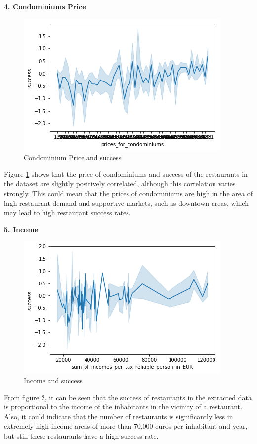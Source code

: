 \documentclass[a4paper, 11pt, oneside]{Thesis}  %
\begin{document}
\textbf{4.	Condominiums Price}
 
\begin{figure}[h]
\includegraphics[scale=0.7]{Figures/Exploratory/lineplot_prices_for_condominiums.png}
\centering
\caption{Condominium Price and success}
\label{fig:lineplot_prices_for_condominiums}
\end{figure}
 
Figure \ref{fig:lineplot_prices_for_condominiums} shows that the price of condominiums and success of the restaurants in the dataset are slightly positively correlated, although this correlation varies strongly. This could mean that the prices of condominiums are high in the area of high restaurant demand and supportive markets, such as downtown areas, which may lead to high restaurant success rates.

\textbf{5.	Income}
 
\begin{figure}[h]
\includegraphics[scale=0.7]{Figures/Exploratory/lineplot_income.png}
\centering
\caption{Income and success}
\label{fig:lineplot_income}
\end{figure}

From figure \ref{fig:lineplot_income}, it can be seen that the success of restaurants in the extracted data is proportional to the income of the inhabitants in the vicinity of a restaurant. Also, it could indicate that the number of restaurants is significantly less in extremely high-income areas of more than 70,000 euros per inhabitant and year, but still these restaurants have a high success rate.
\end{document}
